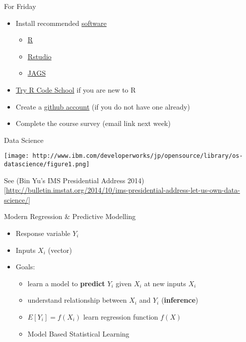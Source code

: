 \documentclass[ignorenonframetext,]{beamer}
\providecommand{\tightlist}{%
  \setlength{\itemsep}{0pt}\setlength{\parskip}{0pt}}
\begin{document}
\begin{frame}{For Friday}
\protect\hypertarget{for-friday}{}

\begin{itemize}[<+->]
\tightlist
\item
  Install recommended
  \href{http://www2.stat.duke.edu/courses/Spring17/sta521/resources/}{software}

  \begin{itemize}[<+->]
  \tightlist
  \item
    \href{http://cran.r-project.org}{R}
  \item
    \href{https://www.rstudio.com/products/rstudio/download/}{Rstudio}
  \item
    \href{http://mcmc-jags.sourceforge.net}{JAGS}
  \end{itemize}
\item
  \href{https://www.codeschool.com/courses/try-r}{Try R Code School} if
  you are new to R
\item
  Create a \href{http://github.com}{github account} (if you do not have
  one already)
\item
  Complete the course survey (email link next week)
\end{itemize}

\end{frame}

\begin{frame}{Data Science}
\protect\hypertarget{data-science}{}

\texttt{[image: http://www.ibm.com/developerworks/jp/opensource/library/os-datascience/figure1.png]}

See (Bin Yu’s IMS Presidential Address
2014){[}\url{http://bulletin.imstat.org/2014/10/ims-presidential-address-let-us-own-data-science/}{]}

\end{frame}

\begin{frame}{Modern Regression \& Predictive Modelling}
\protect\hypertarget{modern-regression-predictive-modelling}{}

\begin{itemize}[<+->]
\tightlist
\item
  Response variable \(Y_i\)
\item
  Inputs \(X_i\) (vector)
\item
  Goals:

  \begin{itemize}[<+->]
  \tightlist
  \item
    learn a model to \textbf{predict} \(Y_i\) given \(X_i\) at new
    inputs \(X_i\)\\
  \item
    understand relationship between \(X_i\) and \(Y_i\)
    (\textbf{inference})
  \item
    \(E[Y_i] = f(X_i)\) learn regression function \(f(X)\)
  \item
    Model Based Statistical Learning
  \end{itemize}
\end{itemize}

\end{frame}
\end{document}
